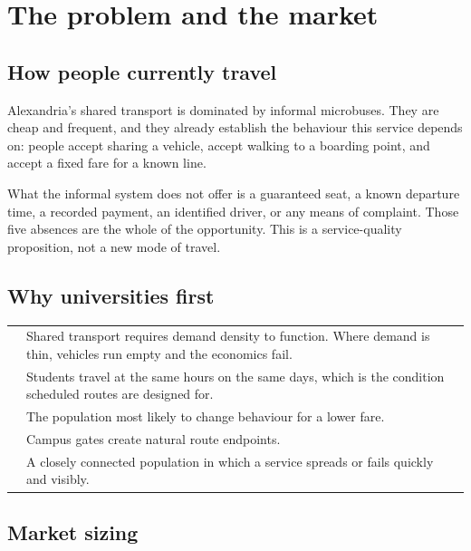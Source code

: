 \chapter{The problem and the market}

\section{How people currently travel}

Alexandria's shared transport is dominated by informal microbuses. They are cheap and frequent, and
they already establish the behaviour this service depends on: people accept sharing a vehicle,
accept walking to a boarding point, and accept a fixed fare for a known line.

What the informal system does not offer is a guaranteed seat, a known departure time, a recorded
payment, an identified driver, or any means of complaint. Those five absences are the whole of the
opportunity. This is a service-quality proposition, not a new mode of travel.

\section{Why universities first}

\begin{center}
\begin{tabularx}{\textwidth}{@{}L{40mm}Y@{}}
\toprule
{} & Shared transport requires demand density to function. Where demand is thin, vehicles run empty and the economics fail. \\
 & Students travel at the same hours on the same days, which is the condition scheduled routes are designed for. \\
 & The population most likely to change behaviour for a lower fare. \\
 & Campus gates create natural route endpoints. \\
 & A closely connected population in which a service spreads or fails quickly and visibly. \\
\bottomrule
\end{tabularx}
\end{center}

\section{Market sizing}


